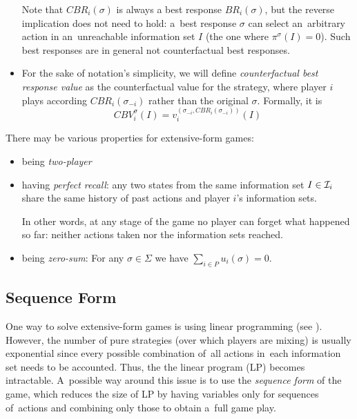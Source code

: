 \begin{itemize}
    Note that $CBR _i (\sigma)$ is always a best response $BR _i (\sigma)$, but the reverse implication does not need to hold:
    a~best response $\sigma$ can select an~arbitrary action in an~unreachable information set $I$ (the one where $\pi ^\sigma (I) = 0$).
    Such best responses are in general not counterfactual best responses.

  \item For the sake of notation's simplicity, we will define \emph{counterfactual best response value} as the counterfactual value for the strategy, where player $i$ plays according $CBR _i (\sigma _{-i})$ rather than the original $\sigma$.
    Formally, it is
    \[ CBV _i ^\sigma (I) = v _i ^{(\sigma _{-i}, CBR _i (\sigma _{-i} ))} (I) \]

\end{itemize}

There may be various properties for extensive-form games:

\begin{itemize}
  \item being \emph{two-player}
  \item having \emph{perfect recall}: any two states from the same information set $I \in \mathcal{I} _i$ share the same history of past actions and player $i$'s information sets.

    In other words, at any stage of the game no player can forget what happened so far:
    neither actions taken nor the information sets reached.
  \item being \emph{zero-sum}: For any $\sigma \in \Sigma$ we have $\sum _{i \in P} u _i (\sigma) = 0$.
\end{itemize}

\subsection{Sequence Form}

One way to solve extensive-form games is using linear programming (see \cite{AGT07}).
However, the number of pure strategies (over which players are mixing) is usually exponential since every possible combination of~all actions in~each information set needs to be accounted.
Thus, the the linear program (LP) becomes intractable.
A~possible way around this issue is to use the \emph{sequence form} of the game, which reduces the size of LP by having variables only for sequences of~actions and combining only those to obtain a~full game play.


